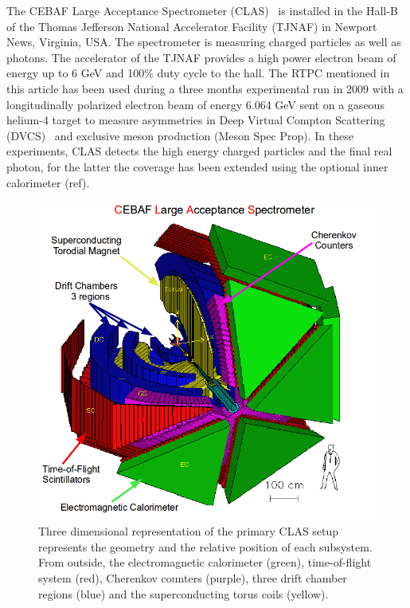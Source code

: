 \documentclass[reprint, amsmath,amssymb, aps]{revtex4}
\begin{document}
The CEBAF Large Acceptance Spectrometer (CLAS)~\cite{CLASref} is installed in 
the Hall-B of the Thomas Jefferson National Accelerator Facility (TJNAF) in 
Newport News, Virginia, USA. The spectrometer is measuring charged particles as 
well as photons. The accelerator of the TJNAF provides a high power electron 
beam of energy up to 6 GeV and 100$\%$ duty cycle to the hall. The RTPC 
mentioned in this article has been used during a three months experimental run 
in 2009 with a longitudinally polarized electron beam of energy 6.064 GeV sent 
on a gaseous helium-4 target to measure asymmetries in Deep Virtual Compton 
Scattering (DVCS)~\cite{proposal} and exclusive meson production (Meson Spec 
Prop). In these experiments, CLAS detects the high energy charged particles and 
the final real photon, for the latter the coverage has been extended using the 
optional inner calorimeter (ref). 

\begin{figure}[h]
\centering 
\includegraphics[scale=0.3]{fig/test_clas.png}
\caption{\small\sf Three dimensional representation of the primary CLAS setup represents the geometry and the relative position of each subsystem. From outside, the electromagnetic calorimeter (green), time-of-flight system (red), Cherenkov counters (purple), three drift chamber regions (blue) and the superconducting torus coils (yellow).} 
\label{fig:CLAS}
\end{figure}
\end{document}
